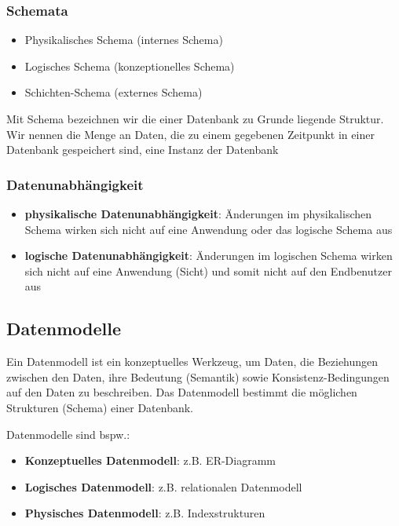 \subsubsection*{Schemata \cite{dewiki:Schema}\cite{skript}}
\begin{itemize}
    \item Physikalisches Schema (internes Schema)
    \item Logisches Schema (konzeptionelles Schema)
    \item Schichten-Schema (externes Schema)
\end{itemize} 
\begin{mybox}[title=Schema und Instanz]
Mit \Gls{Schema} bezeichnen wir die einer Datenbank zu Grunde liegende Struktur. Wir nennen die Menge an Daten, die zu einem gegebenen Zeitpunkt in
einer Datenbank gespeichert sind, eine \Gls{Instanz} der Datenbank
\end{mybox}
\subsubsection*{Datenunabhängigkeit \cite{dewiki:Datenunabhängigkeit}\cite{skript}}
\begin{itemize}
    \item \textbf{physikalische Datenunabhängigkeit}: Änderungen im physikalischen Schema wirken sich nicht auf eine Anwendung oder das logische Schema aus
    \item \textbf{logische Datenunabhängigkeit}: Änderungen im logischen Schema wirken sich nicht auf eine Anwendung (Sicht) und somit nicht auf den Endbenutzer aus 
\end{itemize}
\subsection{Datenmodelle}
\begin{mybox}[title=Datenmodell]
Ein \Gls{Datenmodell} ist ein konzeptuelles Werkzeug, um Daten, die Beziehungen zwischen den Daten, ihre Bedeutung (Semantik) sowie Konsistenz-Bedingungen auf den Daten zu beschreiben. Das Datenmodell bestimmt die möglichen Strukturen (\Gls{Schema}) einer Datenbank.
\end{mybox}
Datenmodelle sind bspw.\cite{dewiki:Datenmodell}: 
\begin{itemize}
    \item \textbf{Konzeptuelles Datenmodell}: z.B. ER-Diagramm
    \item \textbf{Logisches Datenmodell}: z.B. relationalen Datenmodell
    \item \textbf{Physisches Datenmodell}: z.B. Indexstrukturen
\end{itemize}
